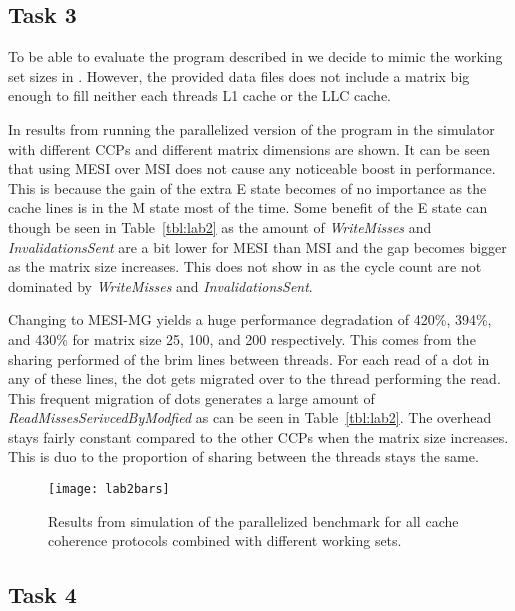 \subsection{Task 3}
To be able to evaluate the program described in  we decide to mimic the working set sizes in . However, the provided data files does not include a matrix big enough to fill neither each threads L1 cache or the LLC cache.

In  results from running the parallelized version of the program in the simulator with different CCPs and different matrix dimensions are shown. It can be seen that using MESI over MSI does not cause any noticeable boost in performance. This is because the gain of the extra E state becomes of no importance as the cache lines is in the M state most of the time. Some benefit of the E state can though be seen in Table~\ref{tbl:lab2} as the amount of \textit{WriteMisses} and \textit{InvalidationsSent} are a bit lower for MESI than MSI and the gap becomes bigger as the matrix size increases. This does not show in  as the cycle count are not dominated by \textit{WriteMisses} and \textit{InvalidationsSent}.

Changing to MESI-MG yields a huge performance degradation of 420\%, 394\%, and 430\% for matrix size 25, 100, and 200 respectively. This comes from the sharing performed of the brim lines between threads. For each read of a dot in any of these lines, the dot gets migrated over to the thread performing the read. This frequent migration of dots generates a large amount of \textit{ReadMissesSerivcedByModfied} as can be seen in Table~\ref{tbl:lab2}. The overhead stays fairly constant compared to the other CCPs when the matrix size increases. This is duo to the proportion of sharing between the threads stays the same.  

\begin{figure}[t]
	\center
	\texttt{[image: lab2bars]}
	\caption{Results from simulation of the parallelized benchmark for all cache coherence protocols combined with different working sets.}
	\label{fig:lab2}
\end{figure}

\subsection{Task 4}

